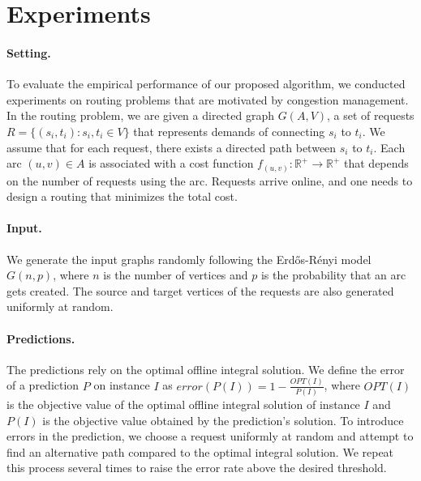 
\section{Experiments}

\paragraph{Setting.}
To evaluate the empirical performance of our proposed algorithm, we conducted experiments on routing problems
that are motivated by congestion management.
In the routing problem, we are given a directed graph $G(A,V)$, a set of requests $R = \{(s_{i}, t_{i}) : s_{i}, t_{i} \in V\}$ that represents demands of
connecting $s_{i}$ to $t_{i}$. We assume that for each request, there exists a directed path between $s_{i}$ to $t_{i}$.
Each arc $(u, v) \in A$ is associated with a cost function $f_{(u,v)}: \mathbb{R}^{+} \rightarrow \mathbb{R}^{+}$ that depends on the number of requests using the arc.
Requests arrive online, and one needs to design a routing that minimizes the total cost.


\paragraph{Input.}
We generate the input graphs randomly following the Erd\H{o}s-Rényi model $G(n, p)$, where $n$ is the number of vertices and $p$ is the probability that an arc gets created. The source and target vertices of the requests are also generated uniformly at random.

\paragraph{Predictions.}
The predictions rely on the optimal offline integral solution.
We define the error of a prediction $P$ on instance $I$ as $error(P(I)) = 1 - \frac{OPT(I)}{P(I)}$,
where $OPT(I)$ is the objective value of the optimal offline integral solution of instance $I$ and $P(I)$ is the objective value obtained by the prediction's solution.
To introduce errors in the prediction, we choose a request uniformly at random and attempt to find an alternative path compared to the optimal integral solution. We repeat this process several times to raise the error rate above the desired threshold.

